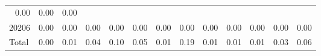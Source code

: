 \begin{table}[!h]
\begin{tabular}{lllllllllllll}
  \multicolumn{1}{r}{0.00} &
  \multicolumn{1}{r}{0.00} &
  \multicolumn{1}{r}{0.00} \\
\multicolumn{1}{l}{\hspace{1em}20206} &
  \multicolumn{1}{|r}{0.00} &
  \multicolumn{1}{r}{0.00} &
  \multicolumn{1}{r}{0.00} &
  \multicolumn{1}{r}{0.00} &
  \multicolumn{1}{r}{0.00} &
  \multicolumn{1}{r}{0.00} &
  \multicolumn{1}{r}{0.00} &
  \multicolumn{1}{r}{0.00} &
  \multicolumn{1}{r}{0.00} &
  \multicolumn{1}{r}{0.00} &
  \multicolumn{1}{r}{0.00} &
  \multicolumn{1}{r}{0.00} \\
\multicolumn{1}{l}{\hspace{1em}Total} &
  \multicolumn{1}{|r}{0.00} &
  \multicolumn{1}{r}{0.01} &
  \multicolumn{1}{r}{0.04} &
  \multicolumn{1}{r}{0.10} &
  \multicolumn{1}{r}{0.05} &
  \multicolumn{1}{r}{0.01} &
  \multicolumn{1}{r}{0.19} &
  \multicolumn{1}{r}{0.01} &
  \multicolumn{1}{r}{0.01} &
  \multicolumn{1}{r}{0.01} &
  \multicolumn{1}{r}{0.03} &
  \multicolumn{1}{r}{0.06} \\
\cline{1-13}
\end{tabular}
\end{table}

